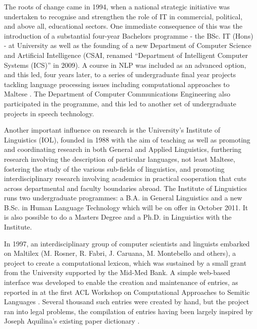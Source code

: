 \documentclass[]{../../metanetpaper}
\begin{document}
\begin{multicols}{2}
The roots of change came in 1994, when a national strategic initiative was undertaken to recognise and strengthen the role of IT in commercial, political, and above all, educational sectors. One immediate consequence of this was the introduction of a substantial four-year Bachelors programme - the BSc. IT (Hons) - at University as well as the founding of a new Department of Computer Science and Artificial Intelligence (CSAI, renamed ``Department of Intelligent Computer Systems (ICS)'' in 2009). A course in NLP was included as an advanced option, and this led, four years later, to a series of undergraduate final year projects tackling language processing issues including computational approaches to Maltese \cite{Galea:1999, Mangion:1999, Farrugia:1999, Farrugia:2000, Mizzi:2000, Bajada:2004, Attard:2005, Farrugia:2008, Farrugia:2009, Vella:2010}. The Department of Computer Communications Engineering also participated in the programme, and this led to another set of undergraduate projects in speech technology.

Another important influence on research is the University’s Institute of Linguistics (IOL), founded in 1988 with the aim of teaching as well as promoting and coordinating research in both General and Applied Linguistics, furthering research involving the description of particular languages, not least Maltese, fostering the study of the various sub-fields of linguistics, and promoting interdisciplinary research involving academics in practical cooperation that cuts across departmental and faculty boundaries abroad. The Institute of Linguistics runs two undergraduate programmes: a B.A. in General Linguistics and a new B.Sc. in Human Language Technology which will be on offer in October 2011. It is also possible to do a Masters Degree and a Ph.D. in Linguistics with the Institute.

In 1997, an interdisciplinary group of computer scientists and linguists  embarked on Maltilex (M. Rosner, R. Fabri, J. Caruana, M. Montebello and others), a project to create a computational lexicon, which was sustained by a small grant from the University supported by the Mid-Med Bank. A simple web-based interface was developed to enable the creation and maintenance of entries, as reported in \cite{Rosner-et-al:1998} at the first ACL Workshop on Computational Approaches to Semitic Languages \cite{Rosner:1998}. Several thousand such entries were created by hand, but the project ran into legal problems, the compilation of entries having been largely inspired by Joseph Aquilina's existing paper dictionary \cite{Aquilina:1987,Aquilina:1990}.


\end{multicols}
\end{document}
